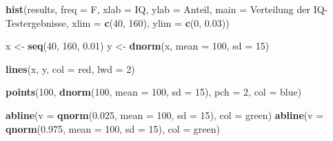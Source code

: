 \documentclass[12pt,a4paper]{article}
\newenvironment{Shaded}{\begin{snugshade}}{\end{snugshade}}
\newcommand{\AttributeTok}[1]{\textcolor[rgb]{0.13,0.29,0.53}{#1}}
\newcommand{\DecValTok}[1]{\textcolor[rgb]{0.00,0.00,0.81}{#1}}
\newcommand{\FloatTok}[1]{\textcolor[rgb]{0.00,0.00,0.81}{#1}}
\newcommand{\FunctionTok}[1]{\textcolor[rgb]{0.13,0.29,0.53}{\textbf{#1}}}
\newcommand{\NormalTok}[1]{#1}
\newcommand{\OtherTok}[1]{\textcolor[rgb]{0.56,0.35,0.01}{#1}}
\newcommand{\StringTok}[1]{\textcolor[rgb]{0.31,0.60,0.02}{#1}}
\begin{document}
\begin{Shaded}
\begin{Highlighting}[]
    \FunctionTok{hist}\NormalTok{(results, }
         \AttributeTok{freq =}\NormalTok{ F, }
         \AttributeTok{xlab =} \StringTok{\textquotesingle{}IQ\textquotesingle{}}\NormalTok{, }
         \AttributeTok{ylab =} \StringTok{\textquotesingle{}Anteil\textquotesingle{}}\NormalTok{, }
         \AttributeTok{main =} \StringTok{\textquotesingle{}Verteilung der IQ{-}Testergebnisse\textquotesingle{}}\NormalTok{, }
         \AttributeTok{xlim =} \FunctionTok{c}\NormalTok{(}\DecValTok{40}\NormalTok{, }\DecValTok{160}\NormalTok{), }
         \AttributeTok{ylim =} \FunctionTok{c}\NormalTok{(}\DecValTok{0}\NormalTok{, }\FloatTok{0.03}\NormalTok{))}
    
\NormalTok{    x }\OtherTok{\textless{}{-}} \FunctionTok{seq}\NormalTok{(}\DecValTok{40}\NormalTok{, }\DecValTok{160}\NormalTok{, }\FloatTok{0.01}\NormalTok{)}
\NormalTok{    y }\OtherTok{\textless{}{-}} \FunctionTok{dnorm}\NormalTok{(x, }\AttributeTok{mean =} \DecValTok{100}\NormalTok{, }\AttributeTok{sd =} \DecValTok{15}\NormalTok{)}
    
    \FunctionTok{lines}\NormalTok{(x, y, }\AttributeTok{col =} \StringTok{\textquotesingle{}red\textquotesingle{}}\NormalTok{, }\AttributeTok{lwd =} \DecValTok{2}\NormalTok{)}
    
    \FunctionTok{points}\NormalTok{(}\DecValTok{100}\NormalTok{, }
           \FunctionTok{dnorm}\NormalTok{(}\DecValTok{100}\NormalTok{, }\AttributeTok{mean =} \DecValTok{100}\NormalTok{, }\AttributeTok{sd =} \DecValTok{15}\NormalTok{), }
           \AttributeTok{pch =} \DecValTok{2}\NormalTok{, }
           \AttributeTok{col =} \StringTok{\textquotesingle{}blue\textquotesingle{}}\NormalTok{)}
    
    \FunctionTok{abline}\NormalTok{(}\AttributeTok{v =} \FunctionTok{qnorm}\NormalTok{(}\FloatTok{0.025}\NormalTok{, }\AttributeTok{mean =} \DecValTok{100}\NormalTok{, }\AttributeTok{sd =} \DecValTok{15}\NormalTok{), }\AttributeTok{col =} \StringTok{\textquotesingle{}green\textquotesingle{}}\NormalTok{)}
    \FunctionTok{abline}\NormalTok{(}\AttributeTok{v =} \FunctionTok{qnorm}\NormalTok{(}\FloatTok{0.975}\NormalTok{, }\AttributeTok{mean =} \DecValTok{100}\NormalTok{, }\AttributeTok{sd =} \DecValTok{15}\NormalTok{), }\AttributeTok{col =} \StringTok{\textquotesingle{}green\textquotesingle{}}\NormalTok{)}
\end{Highlighting}
\end{Shaded}
\end{document}
